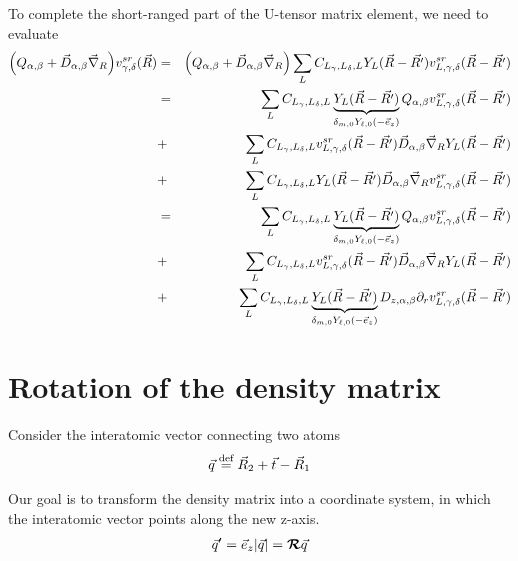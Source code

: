 \documentclass[11pt,a4paper]{report}
\begin{document}
To complete the short-ranged part of the U-tensor matrix element, we
need to evaluate
\begin{eqnarray}
\Bigl(Q_{\alpha,\beta}+\vec{D}_{\alpha,\beta}
\vec{\nabla}_R\Bigr)v^{sr}_{\gamma,\delta}(\vec{R})
&=&\Bigl(Q_{\alpha,\beta}+\vec{D}_{\alpha,\beta}
\vec{\nabla}_R\Bigr)\sum_L 
C_{L_\gamma,L_\delta,L}Y_L(\vec{R}-\vec{R'})
v_{L,\gamma,\delta}^{sr}(\vec{R}-\vec{R'})
\nonumber\\
&=&
\sum_L C_{L_\gamma,L_\delta,L}\underbrace{
Y_L(\vec{R}-\vec{R'})
}_{\delta_{m,0}Y_{\ell,0}(-\vec{e}_z)}
Q_{\alpha,\beta}v_{L,\gamma,\delta}^{sr}(\vec{R}-\vec{R'})
\nonumber\\
&+&
\sum_L 
C_{L_\gamma,L_\delta,L}
v_{L,\gamma,\delta}^{sr}(\vec{R}-\vec{R'})
\vec{D}_{\alpha,\beta}\vec{\nabla}_RY_L(\vec{R}-\vec{R'})
\nonumber\\
&+&
\sum_L 
C_{L_\gamma,L_\delta,L}Y_L(\vec{R}-\vec{R'})
\vec{D}_{\alpha,\beta}
\vec{\nabla}_R
v_{L,\gamma,\delta}^{sr}(\vec{R}-\vec{R'})
\nonumber\\
&=&
\sum_L C_{L_\gamma,L_\delta,L}\underbrace{
Y_L(\vec{R}-\vec{R'})
}_{\delta_{m,0}Y_{\ell,0}(-\vec{e}_z)}
Q_{\alpha,\beta}v_{L,\gamma,\delta}^{sr}(\vec{R}-\vec{R'})
\nonumber\\
&+&
\sum_L 
C_{L_\gamma,L_\delta,L}
v_{L,\gamma,\delta}^{sr}(\vec{R}-\vec{R'})
\vec{D}_{\alpha,\beta}
\vec{\nabla}_RY_L(\vec{R}-\vec{R'})
\nonumber\\
&+&
\sum_L 
C_{L_\gamma,L_\delta,L}
\underbrace{
Y_L(\vec{R}-\vec{R'})
}_{\delta_{m,0}Y_{\ell,0}(-\vec{e}_z)}
D_{z,\alpha,\beta}
\partial_r v_{L,\gamma,\delta}^{sr}(\vec{R}-\vec{R'})
\nonumber\\
\end{eqnarray}

\chapter{Rotation of the density matrix}

Consider the interatomic vector connecting two atoms
\begin{eqnarray}
\vec{q}\stackrel{\text{def}}{=}\vec{R}_2+\vec{t}-\vec{R}_1
\end{eqnarray}

Our goal is to transform the density matrix into a coordinate system,
in which the interatomic vector points along the new z-axis.
\begin{eqnarray}
\vec{q}'=\vec{e}_z|\vec{q}|=\bm{\mathcal{R}}\vec{q}
\end{eqnarray}
\end{document}
